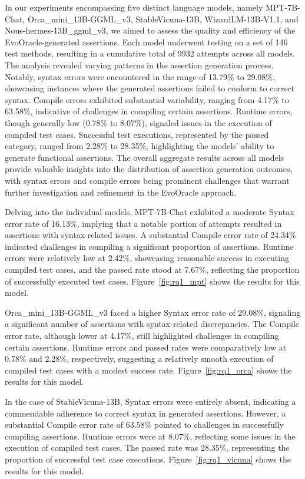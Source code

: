 In our experiments encompassing five distinct language models, namely MPT-7B-Chat, Orca\_mini\_13B-GGML\_v3, StableVicuna-13B, WizardLM-13B-V1.1, and Nous-hermes-13B\_ggml\_v3, we aimed to assess the quality and efficiency of the EvoOracle-generated assertions. Each model underwent testing on a set of 146 test methods, resulting in a cumulative total of 9932 attempts across all models. The analysis revealed varying patterns in the assertion generation process. Notably, syntax errors were encountered in the range of 13.79\% to 29.08\%, showcasing instances where the generated assertions failed to conform to correct syntax. Compile errors exhibited substantial variability, ranging from 4.17\% to 63.58\%, indicative of challenges in compiling certain assertions. Runtime errors, though generally low (0.78\% to 8.07\%), signaled issues in the execution of compiled test cases. Successful test executions, represented by the passed category, ranged from 2.28\% to 28.35\%, highlighting the models' ability to generate functional assertions. The overall aggregate results across all models provide valuable insights into the distribution of assertion generation outcomes, with syntax errors and compile errors being prominent challenges that warrant further investigation and refinement in the EvoOracle approach.

Delving into the individual models, MPT-7B-Chat exhibited a moderate Syntax error rate of 16.13\%, implying that a notable portion of attempts resulted in assertions with syntax-related issues. A substantial Compile error rate of 24.34\% indicated challenges in compiling a significant proportion of assertions. Runtime errors were relatively low at 2.42\%, showcasing reasonable success in executing compiled test cases, and the passed rate stood at 7.67\%, reflecting the proportion of successfully executed test cases. Figure~\ref{fig:rq1_mpt} shows the results for this model.

Orca\_mini\_13B-GGML\_v3 faced a higher Syntax error rate of 29.08\%, signaling a significant number of assertions with syntax-related discrepancies. The Compile error rate, although lower at 4.17\%, still highlighted challenges in compiling certain assertions. Runtime errors and passed rates were comparatively low at 0.78\% and 2.28\%, respectively, suggesting a relatively smooth execution of compiled test cases with a modest success rate. Figure~\ref{fig:rq1_orca} shows the results for this model.

In the case of StableVicuna-13B, Syntax errors were entirely absent, indicating a commendable adherence to correct syntax in generated assertions. However, a substantial Compile error rate of 63.58\% pointed to challenges in successfully compiling assertions. Runtime errors were at 8.07\%, reflecting some issues in the execution of compiled test cases. The passed rate was 28.35\%, representing the proportion of successful test case executions. Figure~\ref{fig:rq1_vicuna} shows the results for this model.

